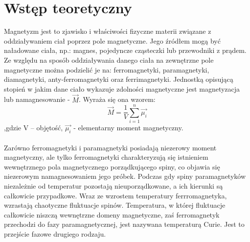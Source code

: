 \documentclass[a4paper,10pt]{article}
\begin{document}
\section{Wstęp teoretyczny}
Magnetyzm jest to zjawisko i właściwości fizyczne materii związane z oddziaływaniem ciał poprzez pole magnetyczne. Jego źródłem mogą być naładowane ciała, np.:
magnes, pojedyncze cząsteczki lub przewodniki z prądem. Ze względu na sposób oddziaływania danego ciała na zewnętrzne pole magnetyczne można podzielić je na:
ferromagnetyki, paramagnetyki, diamagnetyki, anty-ferromagnetyki oraz ferrimagnetyki. Jednostką opisującą stopień w jakim dane ciało wykazuje zdolności magnetyczne jest magnetyzacja lub namagnesowanie - $\vec{M}$. Wyraża się ona wzorem:
\begin{equation}
\vec{M} =\frac{1}{V} \sum_{i=1}^n \vec{\mu_i}
\end{equation}
,gdzie V – objętość, $\vec{\mu_i}$ - elementarny moment magnetyczny.
\\%
\\Zarówno ferromagnetyki i paramagnetyki posiadają niezerowy moment magnetyczny, ale  tylko ferromagnetyki charakteryzują się istnieniem wewnętrznego pola magnetycznego porządkującego spiny, co objawia się niezerowym namagnesowaniem jego próbek. Podczas gdy spiny paramagnetyków niezależnie od temperatur pozostają nieuporządkowane, a ich kierunki są całkowicie przypadkowe. Wraz ze wzrostem temperatury ferrromagnetyka, wzrastają chaotyczne fluktuacje spinów. Temperatura, w której fluktuacje całkowicie niszczą wewnętrzne domeny magnetyczne, zaś ferromagnetyk przechodzi do fazy paramagnetycznej, jest nazywana temperaturą Curie. Jest to przejście fazowe drugiego rodzaju.
\end{document}
